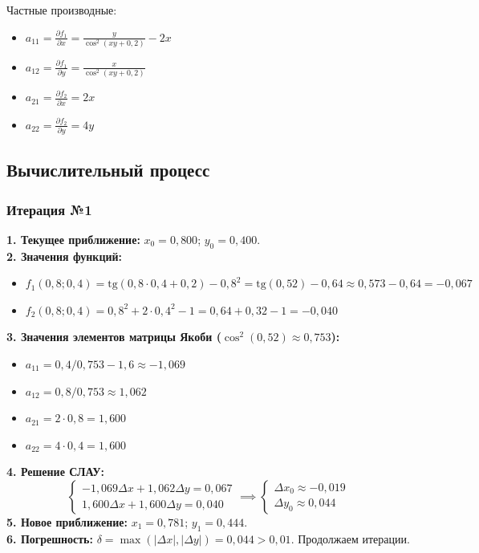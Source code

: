 \documentclass[a4paper,12pt]{article}
\begin{document}
Частные производные:
\begin{itemize}
    \item $a_{11} = \frac{\partial f_1}{\partial x} = \frac{y}{\cos^2(xy+0,2)} - 2x$
    \item $a_{12} = \frac{\partial f_1}{\partial y} = \frac{x}{\cos^2(xy+0,2)}$
    \item $a_{21} = \frac{\partial f_2}{\partial x} = 2x$
    \item $a_{22} = \frac{\partial f_2}{\partial y} = 4y$
\end{itemize}

\subsection{Вычислительный процесс}

\subsubsection*{Итерация №1}
\textbf{1. Текущее приближение:} $x_0 = 0,800$; $y_0 = 0,400$. \\
\textbf{2. Значения функций:}
\begin{itemize}
    \item $f_1(0,8; 0,4) = \text{tg}(0,8 \cdot 0,4 + 0,2) - 0,8^2 = \text{tg}(0,52) - 0,64 \approx 0,573 - 0,64 = -0,067$
    \item $f_2(0,8; 0,4) = 0,8^2 + 2 \cdot 0,4^2 - 1 = 0,64 + 0,32 - 1 = -0,040$
\end{itemize}
\textbf{3. Значения элементов матрицы Якоби ($\cos^2(0,52) \approx 0,753$):}
\begin{itemize}
    \item $a_{11} = 0,4 / 0,753 - 1,6 \approx -1,069$
    \item $a_{12} = 0,8 / 0,753 \approx 1,062$
    \item $a_{21} = 2 \cdot 0,8 = 1,600$
    \item $a_{22} = 4 \cdot 0,4 = 1,600$
\end{itemize}
\textbf{4. Решение СЛАУ:}
\begin{equation*}
\begin{cases} -1,069 \Delta x + 1,062 \Delta y = 0,067 \\ 1,600 \Delta x + 1,600 \Delta y = 0,040 \end{cases} \implies
\begin{cases} \Delta x_0 \approx -0,019 \\ \Delta y_0 \approx 0,044 \end{cases}
\end{equation*}
\textbf{5. Новое приближение:} $x_1 = 0,781$; $y_1 = 0,444$. \\
\textbf{6. Погрешность:} $\delta = \max(|\Delta x|, |\Delta y|) = 0,044 > 0,01$. Продолжаем итерации.
\end{document}

